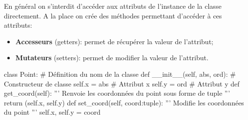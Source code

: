 \begin{definition}{}
En général on s'interdit d'accéder aux attributs de l'instance de la classe directement. A la place on crée des méthodes permettant d'accéder à ces attributs:

\begin{itemize}
    \item \textbf{Accesseurs} (getters): permet de récupérer la valeur de l'attribut;
    \item \textbf{Mutateurs} (setters): permet de modifier la valeur de l'attribut.
\end{itemize}

\begin{CodePythontexAlt}[Largeur=1\linewidth,Centre,Lignes=true,PremLigne=1]{}
    class Point:                                # Définition du nom de la classe
        def __init__(self, abs, ord):       # Constructeur de classe
            self.x = abs                    # Attribut x
            self.y = ord                    # Attribut y
        def get_coord(self):
            ''' Renvoie les coordonnées du point sous forme de tuple '''
            return (self.x, self.y)
        def set_coord(self, coord:tuple):
            ''' Modifie les coordonnées du point '''
            self.x, self.y = coord

    \end{CodePythontexAlt}

\end{definition}

